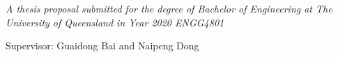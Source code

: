 \nocite{*} %

\maketitle

\vspace{350 pt}

\begin{center}
  \large{\textit{
  A thesis proposal submitted for the degree of Bachelor of Engineering at The University of Queensland in Year 2020
  ENGG4801}}
\end{center}

\vspace{50 pt}

Supervisor: Guaidong Bai and Naipeng Dong

\thispagestyle{empty}

\newpage


\tableofcontents

\newpage


\setcounter{page}{1}